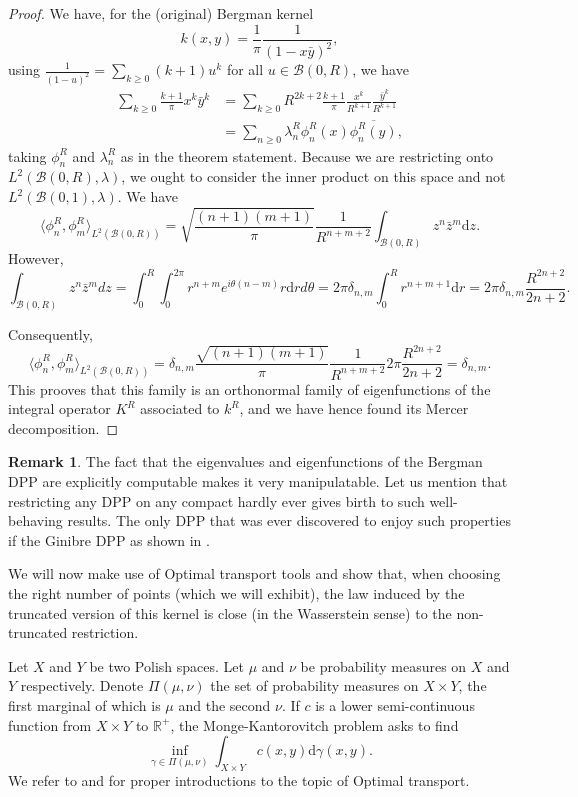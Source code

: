 \documentclass[11pt]{article}
\theoremstyle{plain}
\theoremstyle{definition}
\newtheorem{remark}[definition]{Remark}
\begin{document}
\begin{proof} 
    
We have, for the (original) Bergman kernel
\[
k(x,y) = \frac{1}{\pi} \frac{1}{(1 - x\bar{y})^2},
\]
using $\frac{1  }{(1-u)^2} = \sum_{k \ge 0} (k+1)u^k$ for all $u \in \mathcal{B}(0,R)$, we have
\begin{align*}
\sum_{k \ge 0} \frac{k+1}{\pi} x^k \bar{y}^k &= \sum_{k \ge 0} R^{2k+2} \frac{k+1}{\pi} \frac{x^k}{R^{k+1}} \frac{\bar{y}^k}{R^{k+1}} \\
&= \sum_{n \ge 0} \lambda_n^R \phi_n^R(x) \overline{\phi_n^R(y)},
\end{align*}
taking $\phi_n^R$ and $\lambda_n^R$ as in the theorem statement. Because we are restricting onto $L^2(\mathcal{B}(0,R), \lambda)$, we ought to consider the inner product on this space and not $L^2(\mathcal{B}(0,1), \lambda)$. We have
\[
\langle \phi_n^R, \phi_m^R \rangle_{L^2(\mathcal{B}(0,R))} = \sqrt{\frac{(n+1)(m+1)}{\pi}} \frac{1}{R^{n+m+2}} \int_{\mathcal{B}(0,R)} z^n \bar{z}^m \mathrm dz.
\]
However,
\[
\int_{\mathcal{B}(0,R)} z^n \bar{z}^m dz = \int_0^R \int_0^{2\pi} r^{n+m} e^{i\theta(n-m)} r \mathrm dr d\theta = 2\pi \delta_{n,m} \int_0^R r^{n+m+1} \mathrm dr = 2\pi \delta_{n,m} \frac{R^{2n+2}}{2n+2}.
\]

Consequently,
\[
\langle \phi_n^R, \phi_m^R \rangle_{L^2(\mathcal{B}(0,R))} = \delta_{n,m} \frac{\sqrt{(n+1)(m+1)}}{\pi} \frac{1}{R^{n+m+2}} 2\pi \frac{R^{2n+2}}{2n+2} = \delta_{n,m}.
\]
This prooves that this family is an orthonormal family of eigenfunctions of the integral operator $K^R$ associated to $k^R$, and we have hence found its Mercer decomposition.
\end{proof}

\begin{remark} 
    The fact that the eigenvalues and eigenfunctions of the Bergman DPP are explicitly computable makes it very manipulatable. Let us mention that restricting any DPP on any compact hardly ever gives birth to such well-behaving results. The only DPP that was ever discovered to enjoy such properties if the Ginibre DPP as shown in \cite{DecreusefondMoroz2021}.
\end{remark}

We will now make use of Optimal transport tools and show that, when choosing the right number of points (which we will exhibit), the law induced by the truncated version of this kernel is close (in the Wasserstein sense) to the non-truncated restriction.

Let $X$ and $Y$ be two Polish spaces. Let $\mu$ and $\nu$ be probability measures on $X$ and $Y$ respectively. Denote $\Pi(\mu, \nu)$ the set of probability measures on $X \times Y$, the first marginal of which is $\mu$ and the second $\nu$. If $c$ is a lower semi-continuous function from $X \times Y$ to $\mathbb{R}^+$, the Monge-Kantorovitch problem asks to find
\[
\inf_{\gamma \in \Pi(\mu,\nu)} \int_{X \times Y} c(x,y) \mathrm d\gamma(x,y).
\]
We refer to \cite{Villani2021} and \cite{Villani2009} for proper introductions to the topic of Optimal transport.
\end{document}
